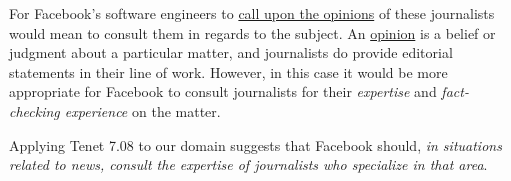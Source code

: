 \par For Facebook's software engineers to \ul{call upon the opinions} of these journalists would mean to consult them in regards to the subject. An \ul{opinion} is a belief or judgment about a particular matter, \cite{dictionary} and journalists do provide editorial statements in their line of work. However, in this case it would be more appropriate for Facebook to consult journalists for their \emph{expertise} and \emph{fact-checking experience} on the matter.


Applying Tenet 7.08 to our domain suggests that Facebook should, \emph{in situations related to news, consult the expertise of journalists who specialize in that area}. 
